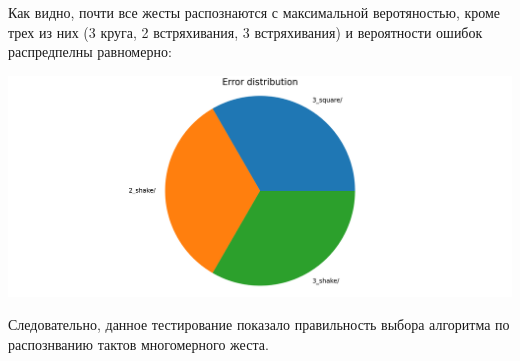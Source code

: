 \documentclass[a4paper]{article}
\begin{document}
Как видно, почти все жесты распознаются с максимальной веротяностью, кроме трех из них (3 круга, 2 встряхивания, 3 встряхивания) и вероятности ошибок распредпелны равномерно:

\includegraphics[scale = 0.17]{error_distribution.png}

Следовательно, данное тестирование показало правильность выбора алгоритма по распознванию тактов многомерного жеста.
\end{document}
